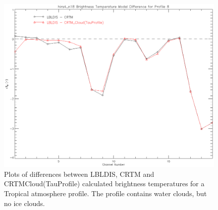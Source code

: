 \begin{figure}[htp]
  \centering{}
  \includegraphics[scale=0.8]{./graphics/Tropical_Clouds_WO_08.eps}
  \caption{Plots of differences between LBLDIS, CRTM and CRTM\textunderscore{}Cloud(TauProfile) calculated brightness temperatures for 
   a Tropical atmosphere profile. The profile contains water clouds, but no ice clouds.}
  \label{fig:Tropical_Cloud_WO}
\end{figure}  






\begin{appendix}
\end{appendix}




